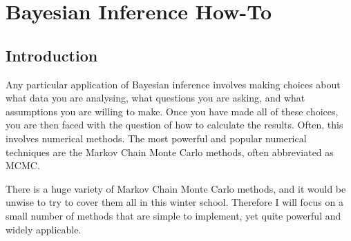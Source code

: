 \author[Lecturer1]{Brendon J. Brewer\\
Department of Statistics, The University of Auckland}

\chapter{Bayesian Inference How-To}

\section{Introduction}


Any particular application of Bayesian inference involves making choices
about what data you are analysing, what questions you are
asking, and what assumptions you are willing to make. Once you have made all
of these choices, you are then faced with the question of how to calculate the
results. Often, this involves numerical methods. The most powerful and
popular numerical techniques are the Markov Chain Monte Carlo methods, often
abbreviated as MCMC.

There is a huge variety of Markov Chain Monte Carlo methods, and it would be
unwise to try to cover them all in this winter school. Therefore I will focus
on a small number of methods that are simple to implement, yet quite powerful
and widely applicable.






%

